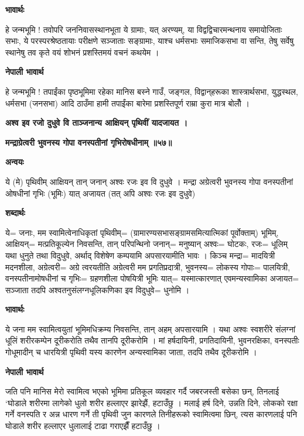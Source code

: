 \documentclass[11pt, a5paper]{article}
\begin{document}
\textbf{भावार्थः}

हे जन्मभूमि ! तवोपरि जननिवासस्थानभूता ये ग्रामाः, यत् अरण्यम्, या विद्वद्विचारमन्थनाय समायोजिताः सभाः, ये परस्परश्रेष्ठतायाः परीक्षणे सञ्जाताः सङ्‍ग्रामाः, याश्च धर्मसभाः समाजिकसभा वा सन्ति, तेषु सर्वेषु स्थानेषु तव कृते वयं शोभनं प्रशस्तिमयं वचनं कथयेम ।

\textbf{नेपाली भावार्थ}

हे जन्मभूमि ! तपाईंका पृष्ठभूमिमा रहेका मानिस बस्ने गाउँ, जङ्गल, विद्वान्‌हरूका शास्त्रार्थसभा, युद्धस्थल, धर्मसभा (जनसभा) आदि ठाउँमा हामी तपाईंका बारेमा प्रशस्तिपूर्ण राम्रा कुरा मात्र बोलौँ ।

\textbf{अश्व इव रजो दुधुवे वि ताञ्जनान्य आक्षियन् पृथिवीं यादजायत ।}

\textbf{मन्द्राग्रेत्वरी भुवनस्य गोपा वनस्पतीनां गृभिरोषधीनाम् ॥५७॥}

\textbf{अन्वयः}

ये (मे) पृथिवीम् आक्षियन् तान् जनान् अश्वः रजः इव वि दुधुवे । मन्द्रा अग्रेत्वरी भुवनस्य गोपा वनस्पतीनां ओषधीनां गृभिः (भूमिः) यात् अजायत (तत् अपि अश्वः रजः इव दुधुवे)

\textbf{शब्दार्थः}

ये= जनाः, मम स्वामित्वेनाधिकृतां पृथिवीम्= (ग्रामारण्यसभासङ्‍ग्रामसमित्यात्मिकां पूर्वोक्ताम्) भूमिम्, आक्षियन्= मत्प्रतिकूल्येन निवसन्ति, तान् परिपन्थिनो जनान्= मनुष्यान् अश्वः= घोटकः, रजः= धूलिम् यथा धुनुते तथा विदुधुवे, अर्थाद् विशेषेण कम्पयामि अपसारयामीति भावः । किञ्च मन्द्रा= मादयित्री मदनशीला, अग्रेत्वरी= अग्रे त्वरयतीति अग्रेत्वरी मम प्रगतिप्रदात्री, भुवनस्य= लोकस्य गोपाः= पालयित्री, वनस्पतीनामोषधीनां च गृभिः= ग्रहणशीला पोषयित्री भूमिः यात्= यस्मात्कारणात् एवमन्यस्वामिका अजायत= सञ्जाता तदपि अश्वतनुसंलग्नधूलिकणिका इव विदुधुवे‍= धुनोमि ।

\textbf{भावार्थः}

ये जना मम स्वामित्वयुतां भूमिमधिक्रम्य निवसन्ति, तान् अहम् अपसारयामि । यथा अश्वः स्वशरीरे संलग्नां धूलिं शरीरकम्पेन दूरीकरोति तथैव तानपि दूरीकरोमि । मां हर्षदायिनी, प्रगतिदायिनी, भुवनरक्षिका, वनस्पतीः गोधूमादीन् च धारयित्री पृथिवी यस्य कारणेन अन्यस्वामिका जाता, तदपि तथैव दूरीकरोमि ।

\textbf{नेपाली भावार्थ}

जति पनि मानिस मेरो स्वामित्व भएको भूमिमा प्रतिकूल व्यवहार गर्दै जबरजस्ती बसेका छन्, तिनलाई ‘घोडाले शरीरमा लागेको धुलो शरीर हल्लाएर झारेझैं, हटाउँछु । मलाई हर्ष दिने, उन्नति दिने, लोकको रक्षा गर्ने वनस्पति र अन्न धारण गर्ने ती पृथिवी जुन कारणले तिनीहरूको स्वामित्वमा छिन्, त्यस कारणलाई पनि घोडाले शरीर हल्लाएर धुलालाई टाढा गराएझैँ हटाउँछु ।
\end{document}
